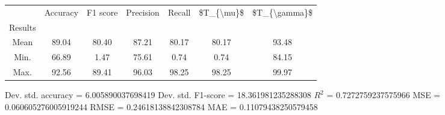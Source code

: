 \begin{tabular}{|c|c|c|c|c|c|c|}
\toprule
{} &  Accuracy &  F1 score &  Precision &  Recall &  \$T\_\{\textbackslash mu\}\$ &  \$T\_\{\textbackslash gamma\}\$ \\
Results &           &           &            &         &            &               \\
\hline
Mean    &     89.04 &     80.40 &      87.21 &   80.17 &      80.17 &         93.48 \\
Min.    &     66.89 &      1.47 &      75.61 &    0.74 &       0.74 &         84.15 \\
Max.    &     92.56 &     89.41 &      96.03 &   98.25 &      98.25 &         99.97 \\
\bottomrule
\end{tabular}

 Dev. std. accuracy = 6.005890037698419
 Dev. std. F1-score = 18.361981235288308
 $R^2$ = 0.7272759237575966
 MSE = 0.060605276005919244
 RMSE = 0.24618138842308784
 MAE = 0.11079438250579458